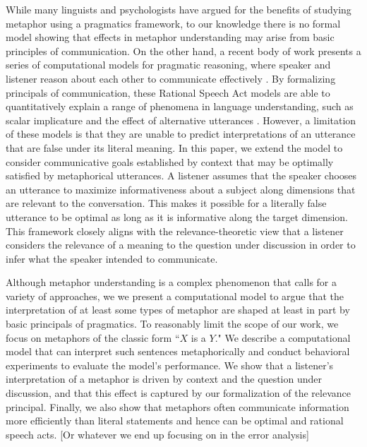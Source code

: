 \documentclass[10pt,letterpaper]{article}
\begin{document}
While many linguists and psychologists have argued for the benefits of studying metaphor using a pragmatics framework, to our knowledge there is no formal model showing that effects in metaphor understanding may arise from basic principles of communication. On the other hand, a recent body of work presents a series of computational models for pragmatic reasoning, where speaker and listener reason about each other to communicate effectively \cite{frank2012predicting, jager2009pragmatic}. By formalizing principals of communication, these Rational Speech Act models are able to quantitatively explain a range of phenomena in language understanding, such as scalar implicature and the effect of alternative utterances \cite{goodman2013knowledge, bergen2012s}. However, a limitation of these models is that they are unable to predict interpretations of an utterance that are false under its literal meaning. In this paper, we extend the model to consider communicative goals established by context that may be optimally satisfied by metaphorical utterances. A listener assumes that the speaker chooses an utterance to maximize informativeness about a subject along dimensions that are relevant to the conversation. This makes it possible for a literally false utterance to be optimal as long as it is informative along the target dimension. This framework closely aligns with the relevance-theoretic view that a listener considers the relevance of a meaning to the question under discussion in order to infer what the speaker intended to communicate. 

Although metaphor understanding is a complex phenomenon that calls for a variety of approaches, we we present a computational model to argue that the interpretation of at least some types of metaphor are shaped at least in part by basic principals of pragmatics. To reasonably limit the scope of our work, we focus on metaphors of the classic form ``$X$ is a $Y$." We describe a computational model that can interpret such sentences metaphorically and conduct behavioral experiments to evaluate the model's performance. We show that a listener's interpretation of a metaphor is driven by context and the question under discussion, and that this effect is captured by our formalization of the relevance principal. Finally, we also show that metaphors often communicate information more efficiently than literal statements and hence can be optimal and rational speech acts. [Or whatever we end up focusing on in the error analysis]
\end{document}
